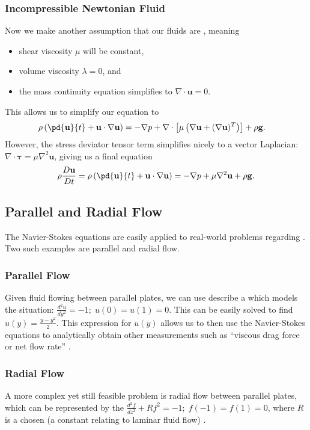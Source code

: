 \documentclass[12pt]{article}
\renewcommand{\vec}[1]{\mathbf{#1}}
\begin{document}
    \subsubsection{Incompressible Newtonian Fluid}
    Now we make another assumption that our fluids are , meaning
    \begin{itemize}
        \item shear viscosity $\mu$ will be constant,
        \item volume viscosity $\lambda=0$, and
        \item the mass continuity equation simplifies to $\nabla \cdot \vec{u}=0$.
    \end{itemize}
    This allows us to simplify our equation to
    \begin{align*}
        \rho\left( \pd{\vec{u}}{t}+\vec{u}\cdot\nabla \vec{u}\right)&= -\nabla p+\nabla \cdot\left[\mu\left( \nabla \vec{u}+(\nabla \vec{u})^T \right)\right] +\rho\vec{g}
    .\end{align*}
    However, the stress deviator tensor term simplifies nicely to a vector Laplacian: $\nabla \cdot \vec{\tau}=\mu\nabla ^2\vec{u}$, giving us a final equation
    \[ \rho \frac{D\vec{u}}{Dt}=\rho\left( \pd{\vec{u}}{t}+\vec{u}\cdot\nabla \vec{u} \right) =-\nabla p+\mu\nabla ^2\vec{u}+\rho\vec{g}. \] 
    \subsection{Parallel and Radial Flow}
    The Navier-Stokes equations are easily applied to real-world problems regarding . Two such examples are parallel and radial flow.
    \subsubsection{Parallel Flow}
    Given fluid flowing between parallel plates, we can use describe a  which models the situation: $\frac{d^2u}{dy^2}=-1;\; u(0)=u(1)=0$. This can be easily solved to find $u(y)=\frac{y-y^2}{2}$. This expression for $u(y)$ allows us to then use the Navier-Stokes equations to analytically obtain other measurements such as ``viscous drag force or net flow rate'' \cite{wiki}.
    \subsubsection{Radial Flow}
    A more complex yet still feasible problem is radial flow between parallel plates, which can be represented by the  $\frac{d^2f}{dz^2}+Rf^2=-1;\;f(-1)=f(1)=0$, where $R$ is a chosen  (a constant relating to laminar fluid flow) \cite{wiki}.
\end{document}
